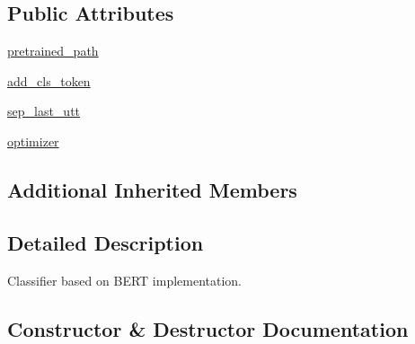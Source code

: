 \subsection*{Public Attributes}
\begin{DoxyCompactItemize}
\item 
\hyperlink{classparlai_1_1agents_1_1bert__classifier_1_1bert__classifier_1_1BertClassifierAgent_a27d04268a995c5f8aad0061dff4b2b13}{pretrained\+\_\+path}
\item 
\hyperlink{classparlai_1_1agents_1_1bert__classifier_1_1bert__classifier_1_1BertClassifierAgent_a23a9fab5a21c9ee44ab416476b7f0361}{add\+\_\+cls\+\_\+token}
\item 
\hyperlink{classparlai_1_1agents_1_1bert__classifier_1_1bert__classifier_1_1BertClassifierAgent_a4cfb560c49609df56c6867623cfb06d2}{sep\+\_\+last\+\_\+utt}
\item 
\hyperlink{classparlai_1_1agents_1_1bert__classifier_1_1bert__classifier_1_1BertClassifierAgent_a5cd45872525e6bd69c29f1cadfa675ed}{optimizer}
\end{DoxyCompactItemize}
\subsection*{Additional Inherited Members}


\subsection{Detailed Description}
\begin{DoxyVerb}Classifier based on BERT implementation.
\end{DoxyVerb}
 

\subsection{Constructor \& Destructor Documentation}
\mbox{\label{classparlai_1_1agents_1_1bert__classifier_1_1bert__classifier_1_1BertClassifierAgent_ac05f1d52c400de5b60284121b4a49746}} 
